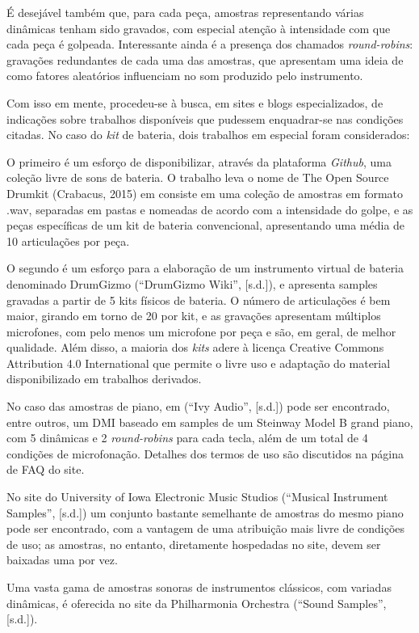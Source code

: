 \documentclass[]{article}
\begin{document}
É desejável também que, para cada peça, amostras representando várias
dinâmicas tenham sido gravados, com especial atenção à intensidade com
que cada peça é golpeada. Interessante ainda é a presença dos chamados
\emph{round-robins}: gravações redundantes de cada uma das amostras, que
apresentam uma ideia de como fatores aleatórios influenciam no som
produzido pelo instrumento.

Com isso em mente, procedeu-se à busca, em sites e blogs especializados,
de indicações sobre trabalhos disponíveis que pudessem enquadrar-se nas
condições citadas. No caso do \emph{kit} de bateria, dois trabalhos em
especial foram considerados:

O primeiro é um esforço de disponibilizar, através da plataforma
\emph{Github}, uma coleção livre de sons de bateria. O trabalho leva o
nome de The Open Source Drumkit (Crabacus, 2015) em consiste em uma
coleção de amostras em formato .wav, separadas em pastas e nomeadas de
acordo com a intensidade do golpe, e as peças específicas de um kit de
bateria convencional, apresentando uma média de 10 articulações por
peça.

O segundo é um esforço para a elaboração de um instrumento virtual de
bateria denominado DrumGizmo (``DrumGizmo Wiki'', {[}s.d.{]}), e
apresenta samples gravadas a partir de 5 kits físicos de bateria. O
número de articulações é bem maior, girando em torno de 20 por kit, e as
gravações apresentam múltiplos microfones, com pelo menos um microfone
por peça e são, em geral, de melhor qualidade. Além disso, a maioria dos
\emph{kits} adere à licença Creative Commons Attribution 4.0
International que permite o livre uso e adaptação do material
disponibilizado em trabalhos derivados.

No caso das amostras de piano, em (``Ivy Audio'', {[}s.d.{]}) pode ser
encontrado, entre outros, um DMI baseado em samples de um Steinway Model
B grand piano, com 5 dinâmicas e 2 \emph{round-robins} para cada tecla,
além de um total de 4 condições de microfonação. Detalhes dos termos de
uso são discutidos na página de FAQ do site.

No site do University of Iowa Electronic Music Studios (``Musical
Instrument Samples'', {[}s.d.{]}) um conjunto bastante semelhante de
amostras do mesmo piano pode ser encontrado, com a vantagem de uma
atribuição mais livre de condições de uso; as amostras, no entanto,
diretamente hospedadas no site, devem ser baixadas uma por vez.

Uma vasta gama de amostras sonoras de instrumentos clássicos, com
variadas dinâmicas, é oferecida no site da Philharmonia Orchestra
(``Sound Samples'', {[}s.d.{]}).
\end{document}
